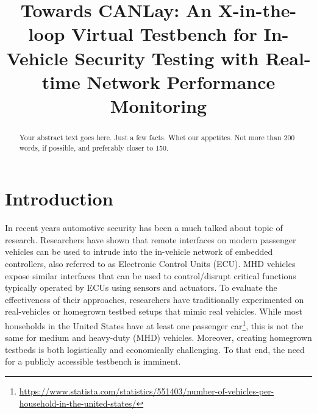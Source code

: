 \documentclass[letterpaper,twocolumn,12pt]{article}
\begin{document}

\date{}

\title{\Large \bf Towards CANLay: An X-in-the-loop Virtual Testbench for In-Vehicle Security Testing with Real-time Network Performance Monitoring}


\maketitle

\begin{abstract}
Your abstract text goes here. Just a few facts. Whet our appetites.
Not more than 200 words, if possible, and preferably closer to 150.
\end{abstract}






\section{Introduction}
In recent years automotive security has been a much talked about topic of research. 
Researchers \cite{checkoway_comprehensive_2011} have shown that remote interfaces on modern passenger vehicles can be used to intrude into the in-vehicle network of embedded controllers, also referred to as Electronic Control Units (ECU). 
MHD vehicles expose similar interfaces that can be used to control/disrupt critical functions \cite{mukherjee_practical_2016,burakova_truck_2016} typically operated by ECUs using sensors and actuators. 
To evaluate the effectiveness of their approaches, researchers have traditionally experimented on real-vehicles or homegrown testbed setups that mimic real vehicles. 
While most households in the United States have at least one passenger car\footnote{\url{https://www.statista.com/statistics/551403/number-of-vehicles-per-household-in-the-united-states/}}, this is not the same for medium and heavy-duty (MHD) vehicles. 
Moreover, creating homegrown testbeds is both logistically and economically challenging. To that end, the need for a publicly accessible testbench is imminent.
\end{document}
